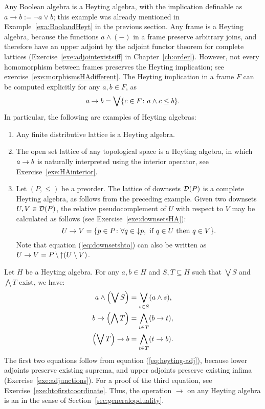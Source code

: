 \begin{example}\label{exa:HAs}
Any Boolean algebra is a Heyting algebra, with the implication definable as $a \to b := \neg a \vee b$; this example was already mentioned in Example~\ref{exa:BoolandHeyt} in the previous section. Any frame is a Heyting algebra, because the functions $a \wedge (-)$ in a frame preserve arbitrary joins, and therefore have an upper adjoint by the adjoint functor theorem for complete lattices (Exercise~\ref{exe:adjointexistsiff} in Chapter~\ref{ch:order}). However, not every homomorphism between frames preserves the Heyting implication; see exercise~\ref{exe:morphismsHAdifferent}.  The Heyting implication in a frame $F$ can be computed explicitly for any $a, b \in F$, as
\[ a \to b = \bigvee \{ c \in F \colon a \wedge c \leq b\}.\]
In particular, the following are examples of Heyting algebras:
\begin{enumerate}
\item Any finite distributive lattice is a Heyting algebra.
\item The open set lattice of any topological space is a Heyting algebra, in which $a \to b$ is naturally interpreted using the interior operator, see Exercise~\ref{exe:HAinterior}.
\item\label{itm:HAdownsets} Let $(P, \leq)$ be a preorder. The lattice of downsets $\mathcal{D}(P)$ is a complete Heyting algebra, as follows from the preceding example. Given two downsets $U, V \in \mathcal{D}(P)$, the relative pseudocomplement of $U$ with respect to $V$ may be calculated as follows (see Exercise~\ref{exe:downsetsHA}):
\begin{equation}\label{eq:downsetshto}
U \to V = \{ p \in P \colon \forall q \in {\downarrow}p, \text{ if } q \in U \text{ then } q \in V\}.
\end{equation}
Note that equation (\ref{eq:downsetshto}) can also be written as $U \to V = P \, {\setminus} \, {\uparrow}(U \setminus V)$.
\end{enumerate}
\end{example}

Let $H$ be a Heyting algebra. For any $a, b \in H$ and $S, T \subseteq H$ such that $\bigvee S$ and $\bigwedge T$ exist, we have:
\begin{align}
a \wedge \left(\bigvee S\right) &= \bigvee_{s \in S} (a \wedge s), \label{eq:heytingframe}\\
b \to \left(\bigwedge T\right) &= \bigwedge_{t \in T} (b \to t), \label{eq:heytingsecondco}\\
\left(\bigvee T\right) \to b &= \bigwedge_{t \in T} (t \to b). \label{eq:heytingfirstco}
\end{align}
The first two equations follow from equation (\ref{eq:heyting-adj}), because lower adjoints preserve existing suprema, and upper adjoints preserve existing infima (Exercise~\ref{exe:adjunctions}). For a proof of the third equation, see Exercise~\ref{exe:htofirstcoordinate}. Thus, the operation $\to$ on any Heyting algebra is an  in the sense of Section~\ref{sec:generalopduality}.

